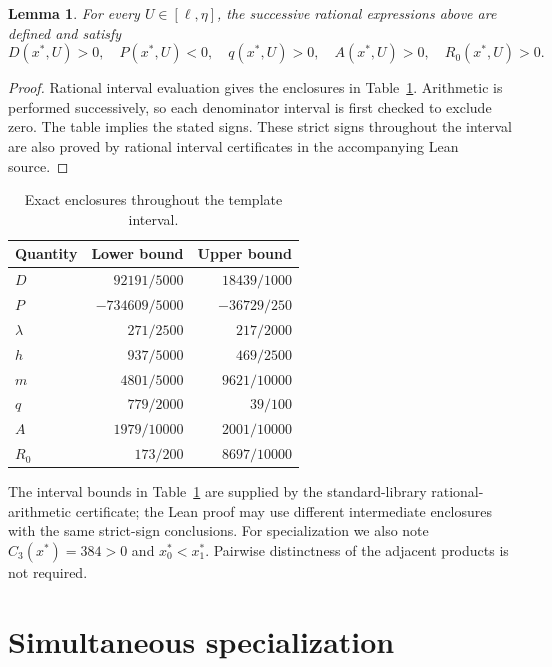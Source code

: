 \documentclass[noproofs]{rmj-public}
\newtheorem{lemma}[thm]{Lemma}
\theoremstyle{definition}
\numberwithin{equation}{section}
\begin{document}
\begin{lemma}\label{lem:template}
For every $U\in[\ell,\eta]$, the successive rational expressions above
are defined and satisfy
\[
D(x^*,U)>0,\quad P(x^*,U)<0,\quad
q(x^*,U)>0,\quad A(x^*,U)>0,\quad R_0(x^*,U)>0.
\]
\end{lemma}
\begin{proof}
Rational interval evaluation gives the enclosures in
Table~\ref{tab:template}. Arithmetic is performed successively, so each
denominator interval is first checked to exclude zero. The table implies
the stated signs. These strict signs throughout the interval are also
proved by rational interval certificates in the accompanying Lean source.
\end{proof}

\begin{table}[ht]
\centering
\caption{Exact enclosures throughout the template interval.}\label{tab:template}
\begin{tabular}{lrr}
\toprule
Quantity&Lower bound&Upper bound\\\midrule
$D$&$92191/5000$&$18439/1000$\\
$P$&$-734609/5000$&$-36729/250$\\
$\lambda$&$271/2500$&$217/2000$\\
$h$&$937/5000$&$469/2500$\\
$m$&$4801/5000$&$9621/10000$\\
$q$&$779/2000$&$39/100$\\
$A$&$1979/10000$&$2001/10000$\\
$R_0$&$173/200$&$8697/10000$\\\bottomrule
\end{tabular}
\end{table}

The interval bounds in Table~\ref{tab:template} are supplied by the
standard-library rational-arithmetic certificate; the Lean proof may use
different intermediate enclosures with the same strict-sign conclusions.
For specialization we also note $C_3(x^*)=384>0$ and $x^*_0<x^*_1$.
Pairwise distinctness of the adjacent products is not required.

\section{Simultaneous specialization}\label{sec:specialize}
\end{document}

